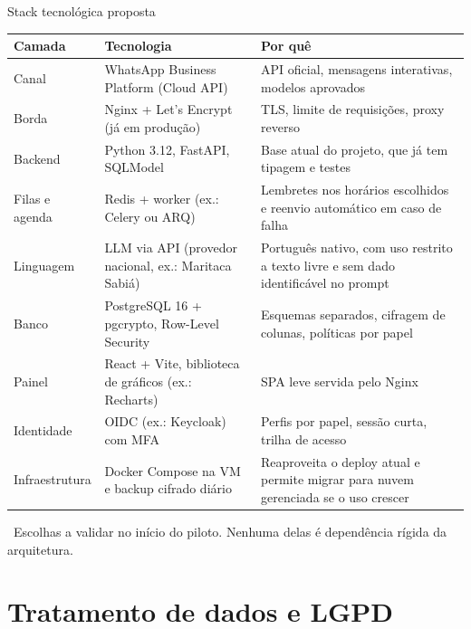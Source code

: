 \documentclass[aspectratio=169,10pt]{beamer}
\newcommand{\fonte}[1]{\par\vfill{\tiny\color{mudo}\faBookOpen\ #1\par}}
\begin{document}
\begin{frame}{Stack tecnológica proposta}
\scriptsize
\begin{tabularx}{\textwidth}{@{}l l L@{}}
\toprule
\textbf{Camada} & \textbf{Tecnologia} & \textbf{Por quê} \\
\midrule
Canal & WhatsApp Business Platform (Cloud API) & API oficial, mensagens interativas, modelos aprovados \\
Borda & Nginx + Let's Encrypt (já em produção) & TLS, limite de requisições, proxy reverso \\
Backend & Python 3.12, FastAPI, SQLModel & Base atual do projeto, que já tem tipagem e testes \\
Filas e agenda & Redis + worker (ex.: Celery ou ARQ) & Lembretes nos horários escolhidos e reenvio automático em caso de falha \\
Linguagem & LLM via API (provedor nacional, ex.: Maritaca Sabiá) & Português nativo, com uso restrito a texto livre e sem dado identificável no prompt \\
Banco & PostgreSQL 16 + pgcrypto, Row-Level Security & Esquemas separados, cifragem de colunas, políticas por papel \\
Painel & React + Vite, biblioteca de gráficos (ex.: Recharts) & SPA leve servida pelo Nginx \\
Identidade & OIDC (ex.: Keycloak) com MFA & Perfis por papel, sessão curta, trilha de acesso \\
Infraestrutura & Docker Compose na VM e backup cifrado diário & Reaproveita o deploy atual e permite migrar para nuvem gerenciada se o uso crescer \\
\bottomrule
\end{tabularx}
\fonte{Escolhas a validar no início do piloto. Nenhuma delas é dependência
  rígida da arquitetura.}
\end{frame}

\section{Tratamento de dados e LGPD}
\end{document}
